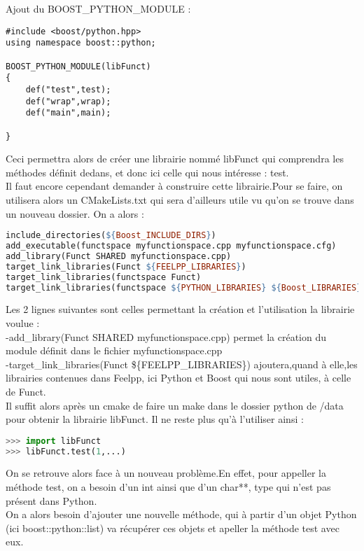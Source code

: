 \documentclass[12pt]{article}
\begin{document}
Ajout du BOOST\_PYTHON\_MODULE :

\begin{lstlisting}
#include <boost/python.hpp>
using namespace boost::python;

BOOST_PYTHON_MODULE(libFunct)
{
    def("test",test); 
    def("wrap",wrap);
    def("main",main);
   
}
\end{lstlisting}

Ceci permettra alors de créer une librairie nommé libFunct qui comprendra les méthodes définit dedans, et donc ici celle qui nous intéresse : test.\\
Il faut encore cependant demander à construire cette librairie.Pour se faire, on utilisera alors un CMakeLists.txt qui sera d'ailleurs utile vu qu'on se trouve dans un nouveau dossier.
On a alors :

\begin{lstlisting}[language=make]
include_directories(${Boost_INCLUDE_DIRS}) 
add_executable(functspace myfunctionspace.cpp myfunctionspace.cfg)
add_library(Funct SHARED myfunctionspace.cpp)
target_link_libraries(Funct ${FEELPP_LIBRARIES})
target_link_libraries(functspace Funct)
target_link_libraries(functspace ${PYTHON_LIBRARIES} ${Boost_LIBRARIES})
\end{lstlisting}

Les 2 lignes suivantes sont celles permettant la création et l'utilisation la librairie voulue :\\
-add\_library(Funct SHARED myfunctionspace.cpp) permet la création du module définit dans le fichier myfunctionspace.cpp\\
-target\_link\_libraries(Funct \$\{FEELPP\_LIBRARIES\}) ajoutera,quand à elle,les librairies contenues dans Feelpp, ici Python et Boost qui nous sont utiles, à celle de Funct.\\

Il suffit alors après un cmake de faire un make dans le dossier python de /data pour obtenir la librairie libFunct. Il ne reste plus qu'à l'utiliser ainsi :

\begin{lstlisting}[language=Python]
>>> import libFunct
>>> libFunct.test(1,...)
\end{lstlisting}

On se retrouve alors face à un nouveau problème.En effet, pour appeller la méthode test, on a besoin d'un int ainsi que d'un char**, type qui n'est pas présent dans Python.\\
On a alors besoin d'ajouter une nouvelle méthode, qui à partir d'un objet Python (ici boost::python::list) va récupérer ces objets et apeller la méthode test avec eux.
\end{document}
